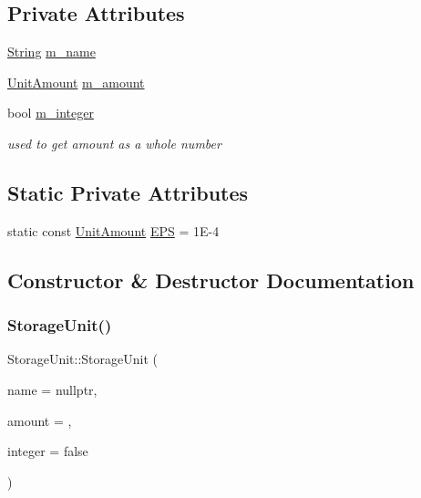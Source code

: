 \subsection*{Private Attributes}
\begin{DoxyCompactItemize}
\item 
\hyperlink{classString}{String} \hyperlink{classStorageUnit_a5cef8bd3450e37f27989a329fda7da83}{m\+\_\+name}
\item 
\hyperlink{StorageUnit_8hpp_a13b2ba6b0400e1aa0b57282bd1228f20}{Unit\+Amount} \hyperlink{classStorageUnit_a7347d44416bdc5c46ad14cc6df8649e1}{m\+\_\+amount}
\item 
bool \hyperlink{classStorageUnit_a6079df4176f8367dc53a97f5445646a4}{m\+\_\+integer}
\begin{DoxyCompactList}\small\item\em used to get amount as a whole number \end{DoxyCompactList}\end{DoxyCompactItemize}
\subsection*{Static Private Attributes}
\begin{DoxyCompactItemize}
\item 
static const \hyperlink{StorageUnit_8hpp_a13b2ba6b0400e1aa0b57282bd1228f20}{Unit\+Amount} \hyperlink{classStorageUnit_af43ba3a77fda788aae3a6b2065d590a3}{E\+PS} = 1\+E-\/4
\end{DoxyCompactItemize}


\subsection{Constructor \& Destructor Documentation}
\mbox{\label{classStorageUnit_aea07bc751e6ffc42161fb52724a3a1a4}} 
\subsubsection{\texorpdfstring{Storage\+Unit()}{StorageUnit()}}
{\footnotesize\ttfamily Storage\+Unit\+::\+Storage\+Unit (\begin{DoxyParamCaption}\item[{\hyperlink{classString}{String} const \&}]{name = {\ttfamily nullptr},  }\item[{\hyperlink{StorageUnit_8hpp_a13b2ba6b0400e1aa0b57282bd1228f20}{Unit\+Amount}}]{amount = {},  }\item[{bool}]{integer = {\ttfamily false} }\end{DoxyParamCaption})}




